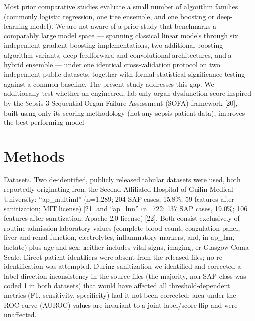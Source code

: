 \documentclass[twoside,11pt]{article}
\begin{document}
Most prior comparative studies evaluate a small number of algorithm families (commonly logistic regression, one tree ensemble, and one boosting or deep-learning model). We are not aware of a prior study that benchmarks a comparably large model space --- spanning classical linear models through six independent gradient-boosting implementations, two additional boosting-algorithm variants, deep feedforward and convolutional architectures, and a hybrid ensemble --- under one identical cross-validation protocol on two independent public datasets, together with formal statistical-significance testing against a common baseline. The present study addresses this gap. We additionally test whether an engineered, lab-only organ-dysfunction score inspired by the Sepsis-3 Sequential Organ Failure Assessment (SOFA) framework [20], built using only its scoring methodology (not any sepsis patient data), improves the best-performing model.

\section{Methods}

Datasets. Two de-identified, publicly released tabular datasets were used, both reportedly originating from the Second Affiliated Hospital of Guilin Medical University: ``ap\_multiml'' (n=1,289; 204 SAP cases, 15.8\%; 59 features after sanitization; MIT license) [21] and ``ap\_lnn'' (n=722; 137 SAP cases, 19.0\%; 106 features after sanitization; Apache-2.0 license) [22]. Both consist exclusively of routine admission laboratory values (complete blood count, coagulation panel, liver and renal function, electrolytes, inflammatory markers, and, in ap\_lnn, lactate) plus age and sex; neither includes vital signs, imaging, or Glasgow Coma Scale. Direct patient identifiers were absent from the released files; no re-identification was attempted. During sanitization we identified and corrected a label-direction inconsistency in the source files (the majority, non-SAP class was coded 1 in both datasets) that would have affected all threshold-dependent metrics (F1, sensitivity, specificity) had it not been corrected; area-under-the-ROC-curve (AUROC) values are invariant to a joint label/score flip and were unaffected.
\end{document}
